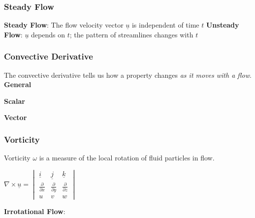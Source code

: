 \subsubsection{Steady Flow}

\textbf{Steady Flow}: The flow velocity vector $\underline{u}$ is independent of time $t$
\newline
\textbf{Unsteady Flow}: $\underline{u}$ depends on $t$; the pattern of streamlines changes with $t$
\subsubsection{Convective Derivative}
The convective derivative tells us how a property changes \textit{as it moves with a flow}.
\\
\textbf{General}
\begin{center}
\end{center}
\textbf{Scalar}
\begin{center}
\end{center}
\textbf{Vector}
\begin{center}
\end{center}
\subsubsection{Vorticity}
Vorticity \underline{$\omega$} is a measure of the local rotation of fluid particles in flow.
\\
\begin{center}
\end{center}
\begin{center}
	$\nabla \times \underline{u} = \begin{vmatrix}
	\underline{i} & \underline{j} & \underline{k}\\ 
	\frac{\partial}{\partial x} & \frac{\partial}{\partial y} & \frac{\partial}{\partial z}\\
	u & v & w 
\end{vmatrix}$
\end{center}
\textbf{Irrotational Flow}:
\\
\begin{center}
\end{center}

